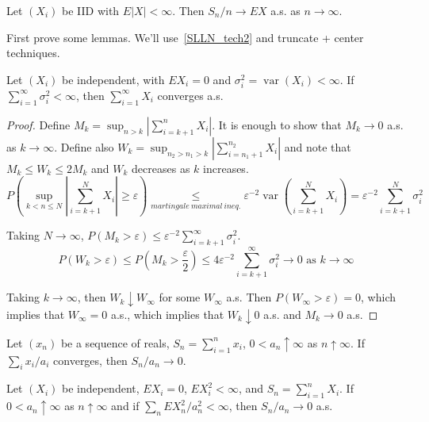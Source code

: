 \begin{thm}[SLLN]
\label{SLLN}
Let $(X_i)$ be IID with $E|X| < \infty$. Then $S_n/n \to EX$ a.s. as $n \to \infty$.
\end{thm}

First prove some lemmas. We'll use~\ref{SLLN_tech2} and truncate + center techniques.
\begin{thm}
\label{SLLN_tech1}
Let $(X_i)$ be independent, with $EX_i = 0$ and $\sigma_i^2 = \operatorname{var}(X_i) < \infty$. If $\sum_{i=1}^{\infty} \sigma_i^2 < \infty$, then $\sum_{i=1}^{\infty} X_i$ converges a.s.
\end{thm}

\begin{proof}
Define $M_k = \sup_{n > k} \left|\sum_{i=k+1}^{n} X_i\right|$. It is enough to show that $M_k \to 0$ a.s. as $k \to \infty$. Define also $W_k = \sup_{n_2 > n_1 > k} \left|\sum_{i=n_1+1}^{n_2} X_i\right|$ and note that $M_k \leq W_k \leq 2M_k$ and $W_k$ decreases as $k$ increases.
\[
P\left(\sup_{k < n \leq N} \left|\sum_{i=k+1}^{N} X_i\right| \geq \varepsilon\right) \underset{martingale \ maximal \ ineq.}{\leq} \varepsilon^{-2} \operatorname{var}\left(\sum_{i=k+1}^{N} X_i\right) = \varepsilon^{-2} \sum_{i=k+1}^{N} \sigma_i^2
\]

Taking $N \to \infty$, $P(M_k > \varepsilon) \leq \varepsilon^{-2} \sum_{i=k+1}^{\infty} \sigma_i^2$.
\[
P(W_k > \varepsilon) \leq P\left(M_k > \frac{\varepsilon}{2}\right) \leq 4\varepsilon^{-2} \sum_{i=k+1}^{\infty} \sigma_i^2 \to 0 \text{ as } k \to \infty
\]

Taking $k \to \infty$, then $W_k \downarrow W_\infty$ for some $W_\infty$ a.s. Then $P(W_\infty > \varepsilon) = 0$, which implies that $W_\infty = 0$ a.s., which implies that $W_k \downarrow 0$ a.s. and $M_k \to 0$ a.s.
\end{proof}

\begin{lem}
\label{Kronecker}
Let $(x_n)$ be a sequence of reals, $S_n = \sum_{i=1}^{n} x_i$, $0 < a_n \uparrow \infty$ as $n \uparrow \infty$. If $\sum_i x_i / a_i$ converges, then $S_n / a_n \to 0$.
\end{lem}

\begin{cor}
\label{SLLN_tech2}
Let $(X_i)$ be independent, $EX_i = 0$, $EX_i^2 < \infty$, and $S_n = \sum_{i=1}^{n} X_i$. If $0 < a_n \uparrow \infty$ as $n \uparrow \infty$ and if $\sum_n EX_n^2 / a_n^2 < \infty$, then $S_n / a_n \to 0$ a.s.
\end{cor}

